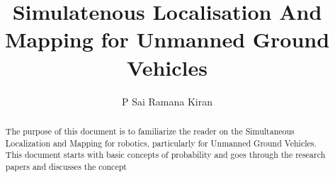 \documentclass[]{report}
\title{Simulatenous Localisation And Mapping for Unmanned Ground Vehicles}
\author{P Sai Ramana Kiran}
\begin{document}
\maketitle

\begin{abstract}
	The purpose of this document is to familiarize the reader on the Simultaneous Localization and Mapping for robotics, particularly for Unmanned Ground Vehicles. This document starts with basic concepts of probability and goes through the research papers and discusses the concept
\end{abstract}
\end{document}
